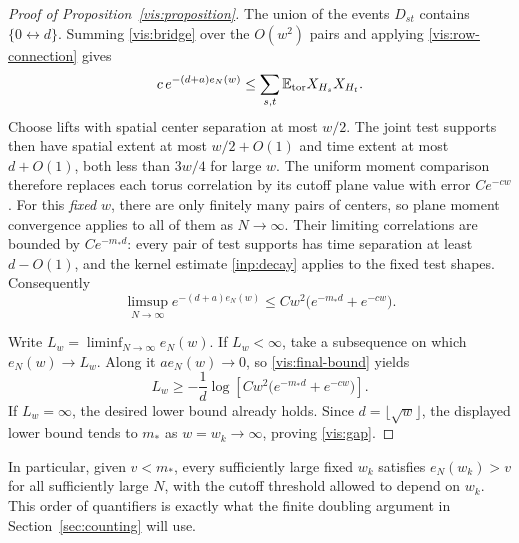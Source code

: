 \begin{proof}[Proof of Proposition~\ref{vis:proposition}]
The union of the events $D_{st}$ contains
$\{0\longleftrightarrow d\}$.  Summing \eqref{vis:bridge} over the
$O(w^2)$ pairs and applying \eqref{vis:row-connection} gives
\[
 c\,e^{-(d+a)e_N(w)}
 \le\sum_{s,t}\mathbb E_{\mathrm{tor}}X_{H_s}X_{H_t}.
\]
Choose lifts with spatial center separation at most $w/2$.
The joint test supports then have spatial extent at most $w/2+O(1)$
and time extent at most $d+O(1)$, both less than $3w/4$ for large $w$.
The uniform moment comparison therefore replaces each torus
correlation by its cutoff plane value with error $Ce^{-cw}$.
For this \emph{fixed} $w$, there are only finitely many pairs of
centers, so plane moment convergence applies to all of them as
$N\to\infty$.  Their limiting correlations are bounded by
$Ce^{-m_*d}$: every pair of test supports has time separation at least
$d-O(1)$, and the kernel estimate \eqref{inp:decay} applies
to the fixed test shapes.  Consequently
\begin{equation}\label{vis:final-bound}
 \limsup_{N\to\infty}e^{-(d+a)e_N(w)}
 \le Cw^2\bigl(e^{-m_*d}+e^{-cw}\bigr).
\end{equation}

Write $L_w=\liminf_{N\to\infty}e_N(w)$.  If $L_w<\infty$, take a
subsequence on which $e_N(w)\to L_w$.  Along it $ae_N(w)\to0$, so
\eqref{vis:final-bound} yields
\[
 L_w\ge -\frac1d\log\!\left[
       Cw^2\bigl(e^{-m_*d}+e^{-cw}\bigr)\right].
\]
If $L_w=\infty$, the desired lower bound already holds.
Since $d=\lfloor\sqrt w\rfloor$, the displayed lower bound tends to
$m_*$ as $w=w_k\to\infty$, proving \eqref{vis:gap}.
\end{proof}

In particular, given $v<m_*$, every sufficiently large fixed $w_k$
satisfies $e_N(w_k)>v$ for all sufficiently large $N$, with the cutoff
threshold allowed to depend on $w_k$.  This order of quantifiers is
exactly what the finite doubling argument in
Section~\ref{sec:counting} will use.
